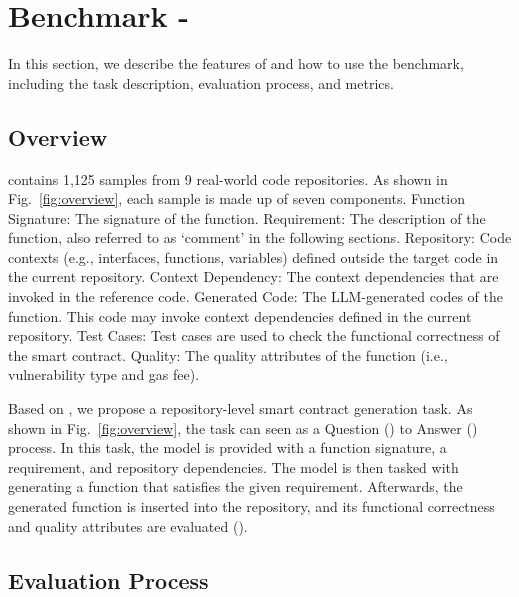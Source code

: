 \section{Benchmark - \datasetname}


In this section, we describe the features of \mytitle and how to use the benchmark, including the task description, evaluation process, and metrics.


\subsection{Overview}

\datasetname contains 1,125 samples from 9 real-world code repositories. 
As shown in Fig.~\ref{fig:overview}, each sample is made up of seven components. 
 Function Signature: The signature of the function. 
 Requirement: The description of the function, also referred to as `comment' in the following sections. 
 Repository: Code contexts (e.g., interfaces, functions, variables) defined outside the target code in the current repository. 
 Context Dependency: The context dependencies that are invoked in the reference code.
 Generated Code: The LLM-generated codes of the function. 
This code may invoke context dependencies defined in the current repository. 
 Test Cases: Test cases are used to check the functional correctness of the smart contract. 
 Quality: The quality attributes of the function (i.e., vulnerability type and gas fee).


Based on \mytitle, we propose a repository-level smart contract generation task. 
As shown in Fig.~\ref{fig:overview}, the task can seen as a Question () to Answer () process. 
In this task, the model is provided with a function signature, a requirement, and repository dependencies.
The model is then tasked with generating a function that satisfies the given requirement. 
Afterwards, the generated function is inserted into the repository, and its functional correctness and quality attributes are evaluated ().


\subsection{Evaluation Process}


